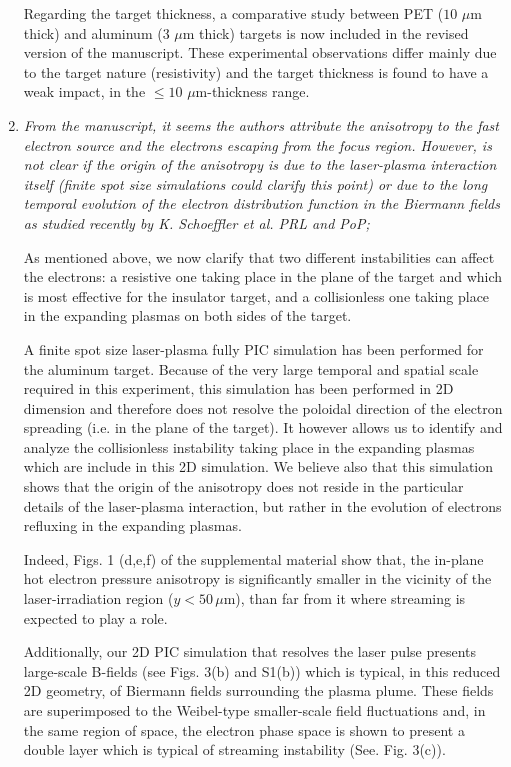 \documentclass{article}
\begin{document}
\begin{enumerate}
Regarding the target thickness, a comparative study between PET ($10$ $\mu$m thick) and aluminum  (3 $\mu$m thick)  targets is now included in the revised version of the manuscript. These experimental observations differ mainly due to the target nature (resistivity) and the target thickness is found to have a weak impact, in the $\le 10$  $\mu$m-thickness range.

\item \textit{From the manuscript, it seems the authors attribute the anisotropy to the fast electron source and the electrons escaping from the focus region. However, is not clear if the origin of the anisotropy is due to the laser-plasma interaction itself (finite spot size simulations could clarify this point) or due to the long temporal evolution of the electron distribution function in the Biermann fields as studied recently by K. Schoeffler et al. PRL and PoP;}

As mentioned above, we now clarify that two different instabilities can affect the electrons: a resistive one taking place in the plane of the target and which is most effective for the insulator target, and a collisionless one taking place in the expanding plasmas on both sides of the target.

A finite spot size laser-plasma fully  PIC simulation has been performed for the aluminum target. 
Because of the very large temporal and spatial scale required in this experiment, this simulation has been performed in 2D dimension and therefore does not resolve the poloidal direction of the electron spreading (i.e. in the plane of the target). It however allows us to identify and analyze the collisionless instability taking place in the expanding plasmas which are include in this 2D simulation.
We believe also that this simulation shows that the origin of the anisotropy does not reside in the particular details of the laser-plasma interaction, but rather in the evolution of electrons refluxing in the expanding plasmas.

Indeed, Figs. 1 (d,e,f) of the supplemental material show that,  the in-plane hot electron pressure anisotropy is significantly smaller
in the vicinity of the laser-irradiation region ($y<50\, \mu$m),  than far from it where streaming is expected to play a role.

Additionally, our 2D PIC simulation that resolves the laser pulse presents large-scale B-fields   (see Figs. 3(b) and S1(b)) which is typical, in this reduced 2D geometry, of Biermann fields surrounding the plasma plume.
These fields are superimposed to the Weibel-type smaller-scale field fluctuations  and, in the same region of space, the electron phase space is shown to present a double layer which is typical of streaming instability (See. Fig. 3(c)).  


\end{enumerate}
\end{document}
